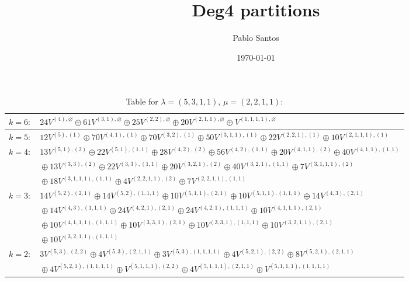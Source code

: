 \documentclass[a4paper,12pt]{article}
\title{Deg4 partitions}
\author{Pablo Santos}
\date{\today}
\begin{document}
 

\maketitle

\renewcommand{\arraystretch}{1.6} 

\begin{table}[H]
\centering
\caption{Table for $\lambda = (5, 3, 1, 1)$, $\mu = (2, 2, 1, 1)$:}
\begin{tabular}{|p{15.5cm}|}
\hline
$k = 6: \quad 24 V^{(4), \varnothing} \oplus 61 V^{(3, 1), \varnothing} \oplus 25 V^{(2, 2), \varnothing} \oplus 20 V^{(2, 1, 1), \varnothing} \oplus V^{(1, 1, 1, 1), \varnothing} $ \\ \hline
$k = 5: \quad 12 V^{(5), (1)} \oplus 70 V^{(4, 1), (1)} \oplus 70 V^{(3, 2), (1)} \oplus 50 V^{(3, 1, 1), (1)} \oplus 22 V^{(2, 2, 1), (1)} \oplus 10 V^{(2, 1, 1, 1), (1)} $ \\ \hline
$k = 4: \quad 13 V^{(5, 1), (2)} \oplus 22 V^{(5, 1), (1, 1)} \oplus 28 V^{(4, 2), (2)} \oplus 56 V^{(4, 2), (1, 1)} \oplus 20 V^{(4, 1, 1), (2)} \oplus 40 V^{(4, 1, 1), (1, 1)} $ \\
$\phantom{k = 4: \quad} \oplus 13 V^{(3, 3), (2)} \oplus 22 V^{(3, 3), (1, 1)} \oplus 20 V^{(3, 2, 1), (2)} \oplus 40 V^{(3, 2, 1), (1, 1)} \oplus 7 V^{(3, 1, 1, 1), (2)} $ \\
$\phantom{k = 4: \quad} \oplus 18 V^{(3, 1, 1, 1), (1, 1)} \oplus 4 V^{(2, 2, 1, 1), (2)} \oplus 7 V^{(2, 2, 1, 1), (1, 1)} $ \\ \hline
$k = 3: \quad 14 V^{(5, 2), (2, 1)} \oplus 14 V^{(5, 2), (1, 1, 1)} \oplus 10 V^{(5, 1, 1), (2, 1)} \oplus 10 V^{(5, 1, 1), (1, 1, 1)} \oplus 14 V^{(4, 3), (2, 1)} $ \\
$\phantom{k = 3: \quad} \oplus 14 V^{(4, 3), (1, 1, 1)} \oplus 24 V^{(4, 2, 1), (2, 1)} \oplus 24 V^{(4, 2, 1), (1, 1, 1)} \oplus 10 V^{(4, 1, 1, 1), (2, 1)} $ \\
$\phantom{k = 3: \quad} \oplus 10 V^{(4, 1, 1, 1), (1, 1, 1)} \oplus 10 V^{(3, 3, 1), (2, 1)} \oplus 10 V^{(3, 3, 1), (1, 1, 1)} \oplus 10 V^{(3, 2, 1, 1), (2, 1)} $ \\
$\phantom{k = 3: \quad} \oplus 10 V^{(3, 2, 1, 1), (1, 1, 1)} $ \\ \hline
$k = 2: \quad 3 V^{(5, 3), (2, 2)} \oplus 4 V^{(5, 3), (2, 1, 1)} \oplus 3 V^{(5, 3), (1, 1, 1, 1)} \oplus 4 V^{(5, 2, 1), (2, 2)} \oplus 8 V^{(5, 2, 1), (2, 1, 1)} $ \\
$\phantom{k = 2: \quad} \oplus 4 V^{(5, 2, 1), (1, 1, 1, 1)} \oplus V^{(5, 1, 1, 1), (2, 2)} \oplus 4 V^{(5, 1, 1, 1), (2, 1, 1)} \oplus V^{(5, 1, 1, 1), (1, 1, 1, 1)} $ \\

\end{tabular}
\end{table}
\end{document}
